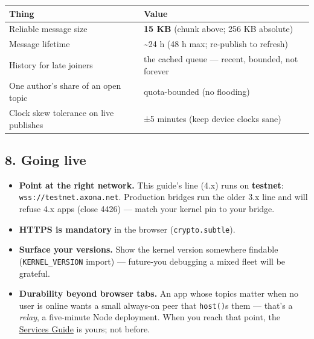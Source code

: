 \documentclass[
  nobib]{tufte-handout}
\newcounter{none} %
\providecommand{\tightlist}{%
  \setlength{\itemsep}{0pt}\setlength{\parskip}{0pt}}
\begin{document}
{\def\LTcaptype{none} %
\begin{longtable}[]{@{}
  >{\raggedright\arraybackslash}p{}
  >{\raggedright\arraybackslash}p{}@{}}
\toprule\noalign{}
\begin{minipage}[b]{\linewidth}\raggedright
Thing
\end{minipage} & \begin{minipage}[b]{\linewidth}\raggedright
Value
\end{minipage} \\
\midrule\noalign{}
\endhead
\bottomrule\noalign{}
\endlastfoot
Reliable message size & \textbf{15 KB} (chunk above; 256 KB absolute) \\
Message lifetime & \textasciitilde24 h (48 h max; re-publish to
refresh) \\
History for late joiners & the cached queue --- recent, bounded, not
forever \\
One author's share of an open topic & quota-bounded (no flooding) \\
Clock skew tolerance on live publishes & ±5 minutes (keep device clocks
sane) \\
\end{longtable}
}

\subsection{8. Going live}\label{going-live}

\begin{itemize}
\tightlist
\item
  \textbf{Point at the right network.} This guide's line (4.x) runs on
  \textbf{testnet}: \texttt{wss://testnet.axona.net}. Production bridges
  run the older 3.x line and will refuse 4.x apps (close 4426) --- match
  your kernel pin to your bridge.
\item
  \textbf{HTTPS is mandatory} in the browser (\texttt{crypto.subtle}).
\item
  \textbf{Surface your versions.} Show the kernel version somewhere
  findable (\texttt{KERNEL\_VERSION} import) --- future-you debugging a
  mixed fleet will be grateful.
\item
  \textbf{Durability beyond browser tabs.} An app whose topics matter
  when no user is online wants a small always-on peer that
  \texttt{host()}s them --- that's a \emph{relay}, a five-minute Node
  deployment. When you reach that point, the
  \href{Axona-Services-Guide-v4.16.0.md}{Services Guide} is yours; not
  before.
\end{itemize}
\end{document}
